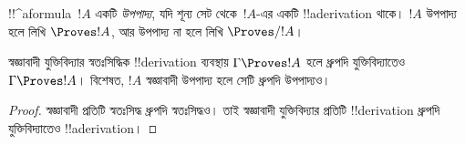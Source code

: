 \documentclass[../../../include/open-logic-section]{subfiles}
\begin{document}
\begin{defn}[উপপাদ্য]
!!^a{formula}~$!A$ একটি \emph{উপপাদ্য}, যদি শূন্য সেট থেকে~$!A$-এর
একটি !!a{derivation} থাকে। $!A$ উপপাদ্য হলে লিখি $\Proves !A$,
আর উপপাদ্য না হলে লিখি $\Proves/ !A$।
\end{defn}

\begin{prop}
  স্বজ্ঞাবাদী যুক্তিবিদ্যার স্বতঃসিদ্ধিক !!{derivation} ব্যবস্থায়
  $\Gamma \Proves !A$ হলে ধ্রুপদি যুক্তিবিদ্যাতেও
  $\Gamma \Proves !A$। বিশেষত, $!A$ স্বজ্ঞাবাদী উপপাদ্য হলে সেটি
  ধ্রুপদি উপপাদ্যও।
\end{prop}

\begin{proof}
  স্বজ্ঞাবাদী প্রতিটি স্বতঃসিদ্ধ ধ্রুপদি স্বতঃসিদ্ধও। তাই
  স্বজ্ঞাবাদী যুক্তিবিদ্যার প্রতিটি !!{derivation} ধ্রুপদি
  যুক্তিবিদ্যাতেও !!a{derivation}।
\end{proof}
\end{document}

